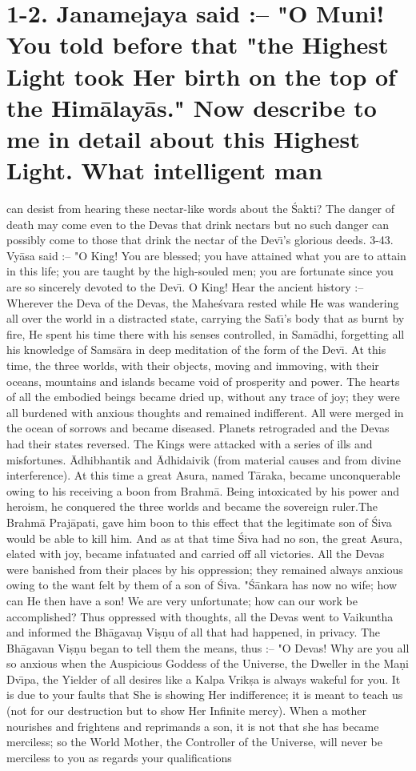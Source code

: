 \chapter{1-2. Janamejaya said :-- "O Muni! You told before that "the Highest Light took Her birth on the top of the Him\=alay\=as." Now describe to me in detail about this Highest Light. What intelligent man}

can desist from hearing these nectar-like words about the \'Sakti? The danger of death may come even to the Devas that drink nectars but no such danger can possibly come to those that drink the nectar of the Dev\={\i}'s glorious deeds.
3-43. Vy\=asa said :-- "O King! You are blessed; you have attained what you are to attain in this life; you are taught by the high-souled men; you are fortunate since you are so sincerely devoted to the Dev\={\i}. O King! Hear the ancient history :--Wherever the Deva of the Devas, the Mahe\'svara rested while He was wandering all over the world in a distracted state, carrying the Sat\={\i}'s body that as burnt by fire, He spent his time there with his senses controlled, in Sam\=adhi, forgetting all his knowledge of Sams\=ara in deep meditation of the form of the Dev\={\i}. At this time, the three worlds, with their objects, moving and immoving, with their oceans, mountains and islands became void of prosperity and power. The hearts of all the embodied beings became dried up, without any trace of joy; they were all burdened with anxious thoughts and remained indifferent. All were merged in the ocean of sorrows and became diseased. Planets retrograded and the Devas had their states reversed. The Kings were attacked with a series of ills and misfortunes. \=Adhibhantik and \=Adhidaivik (from material causes and from divine interference). At this time a great Asura, named T\=araka, became unconquerable owing to his receiving a boon from Brahm\=a. Being intoxicated by his power and heroism, he conquered the three worlds and became the sovereign ruler.The Brahm\=a Praj\=apati, gave him boon to this effect that the legitimate son of \'Siva would be able to kill him. And as at that time \'Siva had no son, the great Asura, elated with joy, became infatuated and carried off all victories. All the Devas were banished from their places by his oppression; they remained always anxious owing to the want felt by them of a son of \'Siva. "\'S\=ankara has now no wife; how can He then have a son! We are very unfortunate; how can our work be accomplished? Thus oppressed with thoughts, all the Devas went to Vaikuntha and informed the Bh\=agava\d{n} Vi\d{s}\d{n}u of all that had happened, in privacy. The Bh\=agavan Vi\d{s}\d{n}u began to tell them the means, thus :-- "O Devas! Why are you all so anxious when the Auspicious Goddess of the Universe, the Dweller in the Ma\d{n}i Dv\={\i}pa, the Yielder of all desires like a Kalpa Vrik\d{s}a is always wakeful for you. It is due to your faults that She is showing Her indifference; it is meant to teach us (not for our destruction but to show Her Infinite mercy). When a mother nourishes and frightens and reprimands a son, it is not that she has became merciless; so the World Mother, the Controller of the Universe, will never be merciless to you as regards your qualifications 